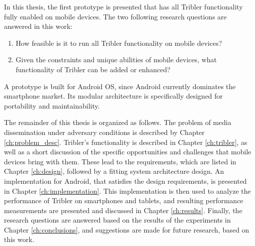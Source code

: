 In this thesis, the first prototype is presented that has all Tribler functionality fully enabled on mobile devices.
The two following research questions are answered in this work:
\begin{enumerate}
	\item How feasible is it to run all Tribler functionality on mobile devices? %
	\item Given the constraints and unique abilities of mobile devices, what functionality of Tribler can be added or enhanced?
\end{enumerate}
A prototype is built for Android OS, since Android currently dominates the smartphone market.
Its modular architecture is specifically designed for portability and maintainability.


The remainder of this thesis is organized as follows.
The problem of media dissemination under adversary conditions is described by Chapter \ref{ch:problem_desc}.
Tribler's functionality is described in Chapter \ref{ch:tribler}, as well as a short discussion of the specific opportunities and challenges that mobile devices bring with them.
These lead to the requirements, which are listed in Chapter \ref{ch:design}, followed by a fitting system architecture design.
An implementation for Android, that satisfies the design requirements, is presented in Chapter \ref{ch:implementation}.
This implementation is then used to analyze the performance of Tribler on smartphones and tablets, and resulting performance measurements are presented and discussed in Chapter \ref{ch:results}.
Finally, the research questions are answered based on the results of the experiments in Chapter \ref{ch:conclusions}, and suggestions are made for future research, based on this work.

